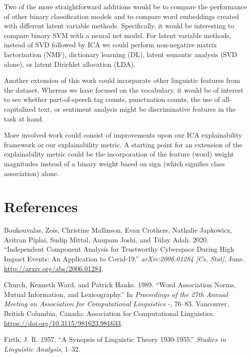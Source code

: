 \documentclass{article}
\begin{document}
Two of the more straightforward additions would be to compare the
performance of other binary classification models and to compare word
embeddings created with different latent variable methods. Specifically,
it would be interesting to compare binary SVM with a neural net model.
For latent variable methods, instead of SVD followed by ICA we could
perform non-negative matrix factorization (NMF), dictionary learning
(DL), latent semantic analysis (SVD alone), or latent Dirichlet
allocation (LDA).

Another extension of this work could incorporate other linguistic
features from the dataset. Whereas we have focused on the vocabulary, it
would be of interest to see whether part-of-speech tag counts,
punctuation counts, the use of all-capitalized text, or sentiment
analysis might be discriminative features in the task at hand.

More involved work could consist of improvements upon our ICA
explainability framework or our explainability metric. A starting point
for an extension of the explainability metric could be the incorporation
of the feature (word) weight magnitudes instead of a binary weight based
on sign (which signifies class association) alone.

\newpage

\hypertarget{references}{%
\section*{References}\label{references}}

\hypertarget{refs}{}
\leavevmode\hypertarget{ref-boukouvalas_independent_2020}{}%
Boukouvalas, Zois, Christine Mallinson, Evan Crothers, Nathalie
Japkowicz, Aritran Piplai, Sudip Mittal, Anupam Joshi, and Tülay Adalı.
2020. ``Independent Component Analysis for Trustworthy Cyberspace During
High Impact Events: An Application to Covid-19.'' \emph{arXiv:2006.01284
{[}Cs, Stat{]}}, June. \url{http://arxiv.org/abs/2006.01284}.

\leavevmode\hypertarget{ref-church_word_1989}{}%
Church, Kenneth Ward, and Patrick Hanks. 1989. ``Word Association Norms,
Mutual Information, and Lexicography.'' In \emph{Proceedings of the 27th
Annual Meeting on Association for Computational Linguistics -}, 76--83.
Vancouver, British Columbia, Canada: Association for Computational
Linguistics. \url{https://doi.org/10.3115/981623.981633}.

\leavevmode\hypertarget{ref-firth_synopsis_1957}{}%
Firth, J. R. 1957. ``A Synopsis of Linguistic Theory 1930-1955.''
\emph{Studies in Linguistic Analysis}, 1--32.
\end{document}
